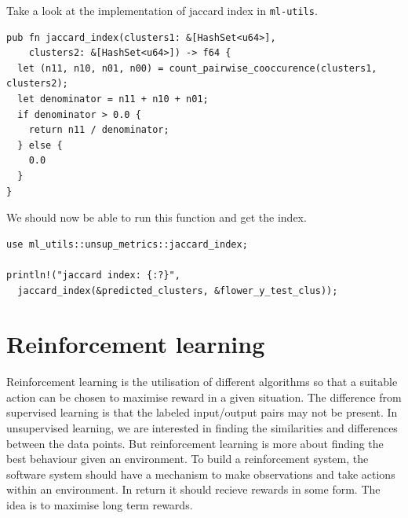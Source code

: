 \documentclass{book}
\begin{document}
Take a look at the implementation of jaccard index in \lstinline{ml-utils}.

\begin{lstlisting}[caption={ml\\-utils\\/src\\/unsup\_metrics\\.rs},basicstyle=\small]
pub fn jaccard_index(clusters1: &[HashSet<u64>],
    clusters2: &[HashSet<u64>]) -> f64 {
  let (n11, n10, n01, n00) = count_pairwise_cooccurence(clusters1, clusters2);
  let denominator = n11 + n10 + n01;
  if denominator > 0.0 {
    return n11 / denominator;
  } else {
    0.0
  }
}
\end{lstlisting}

We should now be able to run this function and get the index.

\begin{lstlisting}[caption={ml\\-utils\\/src\\/unsup\_metrics\\.rs},basicstyle=\small]
use ml_utils::unsup_metrics::jaccard_index;

println!("jaccard index: {:?}",
  jaccard_index(&predicted_clusters, &flower_y_test_clus));
\end{lstlisting}

\label{par:jaccard_index}


\label{sec:testing_an_unsupervised_model}

\section{Reinforcement learning}%
Reinforcement learning is the utilisation of different algorithms so that a suitable action can be chosen to maximise reward in a given situation. The difference from supervised learning is that the labeled input/output pairs may not be present. In unsupervised learning, we are interested in finding the similarities and differences between the data points. But reinforcement learning is more about finding the best behaviour given an environment. To build a reinforcement system, the software system should have a mechanism to make observations and take actions within an environment. In return it should recieve rewards in some form. The idea is to maximise long term rewards.
\end{document}
